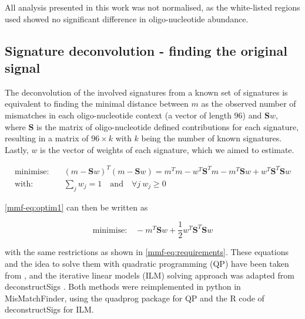 All analysis presented in this work was not normalised, as the white-listed regions used showed no significant difference in oligo-nucleotide abundance.

\subsection[Signature deconvolution]{Signature deconvolution - finding the original signal}
\label{mmf-sec:sigDeconv}
The deconvolution of the involved signatures from a known set of signatures is equivalent to finding the minimal distance between $m$ as the observed number of mismatches in each oligo-nucleotide context (a vector of length 96) and $\textbf{S}w$, where $\textbf{S}$ is the matrix of oligo-nucleotide defined contributions for each signature, resulting in a matrix of $96 \times k$ with $k$ being the number of known signatures. Lastly, $w$ is the vector of weights of each signature, which we aimed to estimate. 

\begin{align}
 \text{minimise:} & \quad (m - \textbf{S}w)^T(m - \textbf{S}w)
 = m^Tm - w^T\textbf{S}^Tm - m^T\textbf{S}w + w^T\textbf{S}^T\textbf{S}w \label{mmf-eq:optim1}\\
 \text{with:} & \quad \sum_j w_j = 1 \quad \text{and} \quad \boldsymbol{\forall} j ~ w_j \geq 0 \label{mmf-eq:requirements}
\end{align}
\myequation[\ref{mmf-eq:optim1}]{MisMatchFinder: optimisation for signature weights}
\myequation[\ref{mmf-eq:requirements}]{MisMatchFinder: optimisation function restrictions}

\autoref{mmf-eq:optim1} can then be written as 

\begin{equation}
\text{minimise:} \quad - m^T\textbf{S}w + \frac{1}{2}w^T\textbf{S}^T\textbf{S}w
\label{mmf-eq:optim2}
\end{equation}
\myequation[\ref{mmf-eq:optim2}]{MisMatchFinder: quadratic programming formula}

with the same restrictions as shown in \autoref{mmf-eq:requirements}. These equations and the idea to solve them with quadratic programming (QP) have been taken from \textcite{Lynch2016}, and the iterative linear models (ILM) solving approach was adapted from deconstructSigs \cite{Rosenthal2016}. Both methods were reimplemented in python in MisMatchFinder, using the quadprog package \cite{McGibbon2021} for QP and  the R code of deconstructSigs for ILM.

